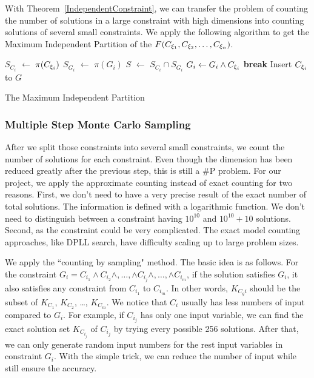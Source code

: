 With Theorem~\ref{IndependentConstraint}, we can transfer the problem of counting the number of 
solutions in a large constraint with high
dimensions into counting solutions of 
several small constraints. We apply the following algorithm to get the Maximum Independent Partition
of the $F(C_{{\xi}_{1}},C_{{\xi}_{2}},\ldots,C_{{\xi}_{n}})$.

\IncMargin{1em}
\begin{algorithm}[h]
\DontPrintSemicolon
{}
{
   $S_{C_i}$ $\leftarrow$ $\pi(C_{{\xi}_{i}})$ \;
   {
   $S_{G_i}$ $\leftarrow$ $\pi(G_{i})$ \;
   $S$ $\leftarrow$ $S_{C_i} \cap S_{G_i}$  \;
   {
      $G_{i} \leftarrow G_{i} \land C_{{\xi}_{i}}$ \;
      \textbf{break} \;
   }
   Insert $C_{{\xi}_{i}}$ to $G$
   }
}
\caption{The Maximum Independent Partition}
\end{algorithm}
\DecMargin{1em}

\subsubsection{Multiple Step Monte Carlo Sampling}

After we split those constraints into several small constraints, we count
the number of solutions for each constraint. Even though the dimension
has been reduced greatly after the previous step, this is still a
\#P problem. For our project, we apply the approximate counting instead of
exact counting for two reasons. First, we don't need to have a very precise
result of the exact number of total solutions. The information is defined with
a logarithmic function. We don't need to distinguish between a constraint having
$10^{10}$ and $10^{10} + 10$ solutions.
Second, as the constraint could be very complicated. The exact model counting
approaches, like DPLL search, have difficulty scaling up to large problem sizes.

We apply the ``counting by sampling" method. The basic idea is as follows.
For the constraint $G_{i}= C_{i_1} \land C_{i_2} \land ,\ldots, \land C_{i_j} \land ,\ldots, 
\land C_{i_m}$, 
if the solution satisfies $G_{i}$, it also
satisfies any constraint from $C_{i_1}$ to $C_{i_m}$. In other words,
$K_{C_gi}$ should be the subset of $K_{C_1}$, $K_{C_2}$, \ldots , $K_{C_m}$.
We notice that $C_i$ usually has less numbers of input compared to $G_{i}$.
For example, if $C_{i_j}$ has only one input variable, we can find the exact
solution set $K_{C_{i_j}}$ of $C_{i_j}$ by trying every possible 256 solutions. After that,
we can only generate random input numbers for the rest input variables in 
constraint $G_{i}$. With the simple trick, we can reduce the number of input while
still ensure the accuracy.

